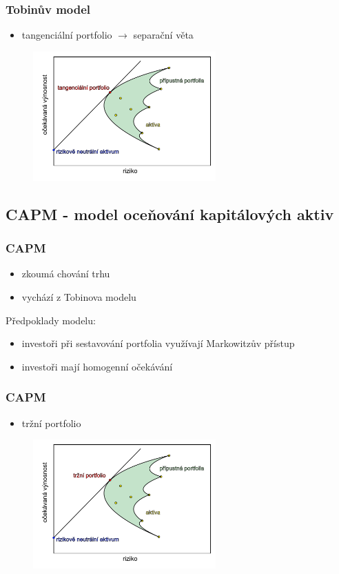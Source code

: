 \documentclass[xcolor=dvipsnames]{beamer}
\theoremstyle{definition} \newtheorem{definice}[veta]{Definice}
\theoremstyle{remark}
\begin{document}
\begin{frame}
  \frametitle{Tobinův model}
  \begin{itemize}
   \item tangenciální portfolio $\to$ separační věta
  \end{itemize} 
  
  \begin{figure}[!htbp]
  \centering 
  \includegraphics[width=7cm]{IMG/graf_1.pdf}
 \end{figure}
\end{frame}

\subsection{CAPM - model oceňování kapitálových aktiv}

\begin{frame}
  \frametitle{CAPM}
  \begin{itemize}
   \item zkoumá chování trhu
   \item vychází z Tobinova modelu
  \end{itemize}  
\vfill
 \textcolor{OliveGreen}{Předpoklady modelu:}
 \begin{itemize}
   \item investoři při sestavování portfolia využívají Markowitzův přístup
   \item investoři mají homogenní očekávání
  \end{itemize}  
\end{frame}

\begin{frame}
  \frametitle{CAPM}
  \begin{itemize}
   \item tržní portfolio 
  \end{itemize} 
  
  \begin{figure}[!htbp]
  \centering 
  \includegraphics[width=7cm]{IMG/graf_CAPM.pdf}
 \end{figure}
\end{frame}
\end{document}
